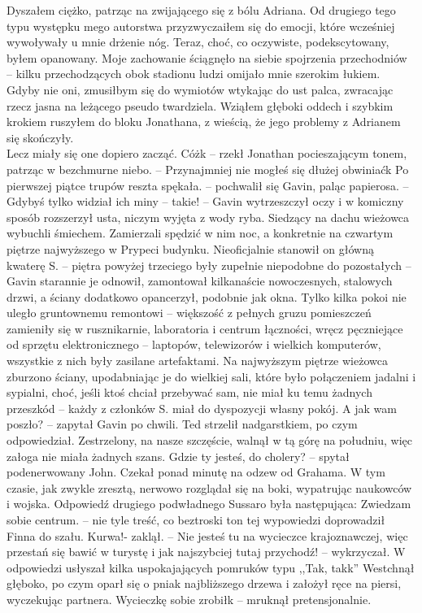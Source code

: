 \documentclass[../MAIN.tex]{subfiles}
\begin{document}
Dyszałem ciężko, patrząc na zwijającego się z bólu Adriana. Od drugiego tego typu występku mego autorstwa przyzwyczaiłem się do emocji, które wcześniej wywoływały u mnie drżenie nóg. Teraz, choć, co oczywiste, podekscytowany, byłem opanowany. Moje zachowanie ściągnęło na siebie spojrzenia przechodniów -- kilku przechodzących obok stadionu ludzi omijało mnie szerokim łukiem. Gdyby nie oni, zmusiłbym się do wymiotów wtykając do ust palca, zwracając rzecz jasna na leżącego pseudo twardziela. Wziąłem głęboki oddech i szybkim krokiem ruszyłem do bloku Jonathana, z wieścią, że jego problemy z Adrianem się skończyły.\\
Lecz miały się one dopiero zacząć.
% 
% 
\sx Cóż\3k -- rzekł Jonathan pocieszającym tonem, patrząc w bezchmurne niebo. -- Przynajmniej nie mogłeś się dłużej obwiniać\3k
\qd
% 
% 
\sx Po pierwszej piątce trupów reszta spękała. -- pochwalił się Gavin, paląc papierosa. -- Gdybyś tylko widział ich miny -- takie! -- Gavin wytrzeszczył oczy i w komiczny sposób rozszerzył usta, niczym wyjęta z wody ryba.
\qd
Siedzący na dachu wieżowca wybuchli śmiechem. Zamierzali spędzić w nim noc, a konkretnie na czwartym piętrze najwyższego w Prypeci budynku. Nieoficjalnie stanowił on główną kwaterę S. -- piętra powyżej trzeciego były zupełnie niepodobne do pozostałych -- Gavin starannie je odnowił, zamontował kilkanaście nowoczesnych, stalowych drzwi, a ściany dodatkowo opancerzył, podobnie jak okna. Tylko kilka pokoi nie uległo gruntownemu remontowi -- większość z pełnych gruzu pomieszczeń zamieniły się w rusznikarnie, laboratoria i centrum łączności, wręcz pęczniejące od sprzętu elektronicznego -- laptopów, telewizorów i wielkich komputerów, wszystkie z nich były zasilane artefaktami. Na najwyższym piętrze wieżowca zburzono ściany, upodabniając je do wielkiej sali, które było połączeniem jadalni i sypialni, choć, jeśli ktoś chciał przebywać sam, nie miał ku temu żadnych przeszkód -- każdy z członków S. miał do dyspozycji własny pokój.
\sx A jak wam poszło? -- zapytał Gavin po chwili.
\qd
Ted strzelił nadgarstkiem, po czym odpowiedział.
\sx Zestrzelony, na nasze szczęście, walnął w tą górę na południu, więc załoga nie miała żadnych szans.
\qd
% 
% 
\sx Gdzie ty jesteś, do cholery? -- spytał podenerwowany John.
\qd
Czekał ponad minutę na odzew od Grahama. W tym czasie, jak zwykle zresztą, nerwowo rozglądał się na boki, wypatrując naukowców i wojska. Odpowiedź drugiego podwładnego Sussaro była następująca:
\sx Zwiedzam sobie centrum. -- nie tyle treść, co beztroski ton tej wypowiedzi doprowadził Finna do szału.
\xx Kurwa!- zaklął. -- Nie jesteś tu na wycieczce krajoznawczej, więc przestań się bawić w turystę i jak najszybciej tutaj przychodź! -- wykrzyczał.
\qd
W odpowiedzi usłyszał kilka uspokajających pomruków typu ,,Tak, tak\3k'' Westchnął głęboko, po czym oparł się o pniak najbliższego drzewa i założył ręce na piersi, wyczekując partnera.
\sx Wycieczkę sobie zrobił\3k -- mruknął pretensjonalnie.
\qd
\end{document}
